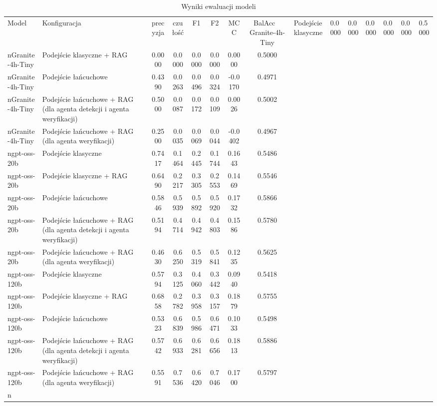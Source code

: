 \begin{table}[htbp]
\centering
\caption{Wyniki ewaluacji modeli}
\label{tab:wyniki}
\begin{tabular}{llcccccc}
\toprule
Model & Konfiguracja & precyzja & czułość & F1 & F2 & MCC & BalAcc \
\midrule
Granite-4h-Tiny & Podejście klasyczne & 0.0000 & 0.0000 & 0.0000 & 0.0000 & 0.0000 & 0.5000 \\nGranite-4h-Tiny & Podejście klasyczne + RAG & 0.0000 & 0.0000 & 0.0000 & 0.0000 & 0.0000 & 0.5000 \\nGranite-4h-Tiny & Podejście łańcuchowe & 0.4390 & 0.0263 & 0.0496 & 0.0324 & -0.0170 & 0.4971 \\nGranite-4h-Tiny & Podejście łańcuchowe + RAG (dla agenta detekcji i agenta weryfikacji) & 0.5000 & 0.0087 & 0.0172 & 0.0109 & 0.0026 & 0.5002 \\nGranite-4h-Tiny & Podejście łańcuchowe + RAG (dla agenta weryfikacji) & 0.2500 & 0.0035 & 0.0069 & 0.0044 & -0.0402 & 0.4967 \\ngpt-oss-20b & Podejście klasyczne & 0.7417 & 0.1464 & 0.2445 & 0.1744 & 0.1643 & 0.5486 \\ngpt-oss-20b & Podejście klasyczne + RAG & 0.6490 & 0.2217 & 0.3305 & 0.2553 & 0.1469 & 0.5546 \\ngpt-oss-20b & Podejście łańcuchowe & 0.5846 & 0.5939 & 0.5892 & 0.5920 & 0.1732 & 0.5866 \\ngpt-oss-20b & Podejście łańcuchowe + RAG (dla agenta detekcji i agenta weryfikacji) & 0.5194 & 0.4714 & 0.4942 & 0.4803 & 0.1586 & 0.5780 \\ngpt-oss-20b & Podejście łańcuchowe + RAG (dla agenta weryfikacji) & 0.4630 & 0.6250 & 0.5319 & 0.5841 & 0.1235 & 0.5625 \\ngpt-oss-120b & Podejście klasyczne & 0.5794 & 0.3125 & 0.4060 & 0.3442 & 0.0940 & 0.5418 \\ngpt-oss-120b & Podejście klasyczne + RAG & 0.6858 & 0.2782 & 0.3958 & 0.3157 & 0.1879 & 0.5755 \\ngpt-oss-120b & Podejście łańcuchowe & 0.5323 & 0.6839 & 0.5986 & 0.6471 & 0.1033 & 0.5498 \\ngpt-oss-120b & Podejście łańcuchowe + RAG (dla agenta detekcji i agenta weryfikacji) & 0.5742 & 0.6933 & 0.6281 & 0.6656 & 0.1813 & 0.5886 \\ngpt-oss-120b & Podejście łańcuchowe + RAG (dla agenta weryfikacji) & 0.5591 & 0.7536 & 0.6420 & 0.7046 & 0.1700 & 0.5797 \\n\bottomrule
\end{tabular}
\end{table}
